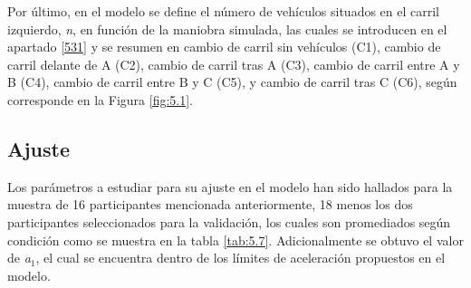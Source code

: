 Por último, en el modelo se define el número de vehículos situados en el carril izquierdo, \emph{n}, en función de la maniobra simulada, las cuales se introducen en el apartado \ref{531} y se resumen en cambio de carril sin vehículos (C1), cambio de carril delante de A (C2), cambio de carril tras A (C3), cambio de carril entre A y B (C4), cambio de carril entre B y C (C5), y cambio de carril tras C (C6), según corresponde en la Figura \ref{fig:5.1}.

\subsection{Ajuste}\label{542}
Los parámetros a estudiar para su ajuste en el modelo han sido hallados para la muestra de 16 participantes mencionada anteriormente, 18 menos los dos participantes seleccionados para la validación, los cuales son promediados según condición como se muestra en la tabla \ref{tab:5.7}. Adicionalmente se obtuvo el valor de \emph{a$_1$}, el cual se encuentra dentro de los límites de aceleración propuestos en el modelo. 

